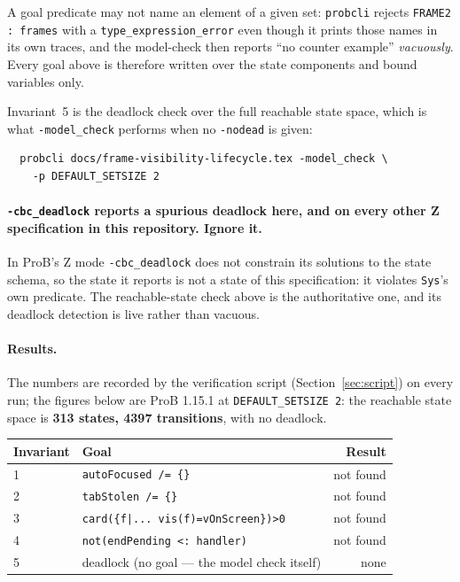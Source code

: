 \documentclass[a4paper,10pt,fleqn]{article}
\begin{document}
A goal predicate may not name an element of a given set: \texttt{probcli}
rejects \texttt{FRAME2 : frames} with a \texttt{type\_expression\_error}
even though it prints those names in its own traces, and the model-check then
reports ``no counter example'' \emph{vacuously}.  Every goal above is therefore
written over the state components and bound variables only.

Invariant~5 is the deadlock check over the full reachable state space, which
is what \texttt{-model\_check} performs when no \texttt{-nodead} is given:
\begin{verbatim}
  probcli docs/frame-visibility-lifecycle.tex -model_check \
    -p DEFAULT_SETSIZE 2
\end{verbatim}

\paragraph{\texttt{-cbc\_deadlock} reports a spurious deadlock here, and on
every other Z specification in this repository.  Ignore it.}
In ProB's Z mode \texttt{-cbc\_deadlock} does not constrain its solutions to
the state schema, so the state it reports is not a state of this
specification: it violates \texttt{Sys}'s own predicate.  The reachable-state
check above is the authoritative one, and its deadlock detection is live
rather than vacuous.

\paragraph{Results.}  The numbers are recorded by the verification script
(Section~\ref{sec:script}) on every run; the figures below are ProB 1.15.1
at \texttt{DEFAULT\_SETSIZE 2}: the reachable state space is \textbf{313
states, 4397 transitions}, with no deadlock.

\begin{center}
\begin{tabular}{llr}
  \textbf{Invariant} & \textbf{Goal} & \textbf{Result} \\
  \hline
  1 & \texttt{autoFocused /= \{\}} & not found \\
  2 & \texttt{tabStolen /= \{\}} & not found \\
  3 & \texttt{card(\{f|...\ vis(f)=vOnScreen\})>0} & not found \\
  4 & \texttt{not(endPending <: handler)} & not found \\
  5 & deadlock (no goal --- the model check itself) & none \\
\end{tabular}
\end{center}
\end{document}
